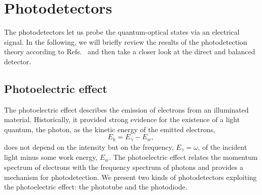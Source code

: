 \section{Photodetectors}\label{sec:photodetectors}

The photodetectors let us probe the quantum-optical states via an electrical signal.
In the following, we will briefly review the results of the photodetection theory according to Refs.~\cite{Mandel1995,Wolf2021} and then take a closer look at the direct and balanced detector.

\subsection{Photoelectric effect}

The photoelectric effect describes the emission of electrons from an illuminated material.
Historically, it provided strong evidence for the existence of a light quantum, the photon, as the kinetic energy of the emitted electrons,
\begin{equation}
	E_k
	=
	E_\gamma
	-
	E_w
	\label{eq:photoelectric_effect}
	,
\end{equation}
does not depend on the intensity but on the frequency, $E_\gamma=\omega$, of the incident light minus some work energy, $E_w$.
The photoelectric effect relates the momentum spectrum of electrons with the frequency spectrum of photons and provides a mechanism for photodetection.
We present two kinds of photodetectors exploiting the photoelectric effect: the phototube and the photodiode.

